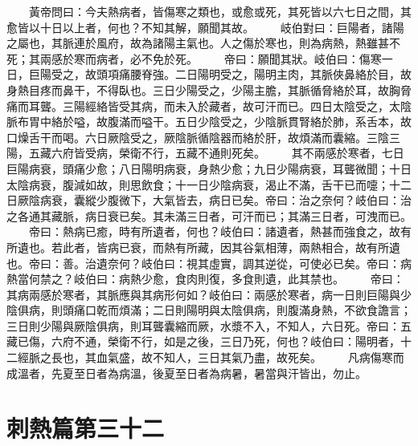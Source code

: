 　　黃帝問曰：今夫熱病者，皆傷寒之類也，或愈或死，其死皆以六七日之間，其愈皆以十日以上者，何也？不知其解，願聞其故。
　　岐伯對曰：巨陽者，諸陽之屬也，其脈連於風府，故為諸陽主氣也。人之傷於寒也，則為病熱，熱雖甚不死；其兩感於寒而病者，必不免於死。
　　帝曰：願聞其狀。岐伯曰：傷寒一日，巨陽受之，故頭項痛腰脊強。二日陽明受之，陽明主肉，其脈俠鼻絡於目，故身熱目疼而鼻干，不得臥也。三日少陽受之，少陽主膽，其脈循脅絡於耳，故胸脅痛而耳聾。三陽經絡皆受其病，而未入於藏者，故可汗而已。四日太陰受之，太陰脈布胃中絡於嗌，故腹滿而嗌干。五日少陰受之，少陰脈貫腎絡於肺，系舌本，故口燥舌干而喝。六日厥陰受之，厥陰脈循陰器而絡於肝，故煩滿而囊縮。三陰三陽，五藏六府皆受病，榮衛不行，五藏不通則死矣。
　　其不兩感於寒者，七日巨陽病衰，頭痛少愈；八日陽明病衰，身熱少愈；九日少陽病衰，耳聾微聞；十日太陰病衰，腹減如故，則思飲食；十一日少陰病衰，渴止不滿，舌干已而嚏；十二日厥陰病衰，囊縱少腹微下，大氣皆去，病日已矣。帝曰：治之奈何？岐伯曰：治之各通其藏脈，病日衰已矣。其未滿三日者，可汗而已；其滿三日者，可洩而已。
　　帝曰：熱病已癒，時有所遺者，何也？岐伯曰：諸遺者，熱甚而強食之，故有所遺也。若此者，皆病已衰，而熱有所藏，因其谷氣相薄，兩熱相合，故有所遺也。帝曰：善。治遺奈何？岐伯曰：視其虛實，調其逆從，可使必已矣。帝曰：病熱當何禁之？岐伯曰：病熱少愈，食肉則復，多食則遺，此其禁也。
　　帝曰：其病兩感於寒者，其脈應與其病形何如？岐伯曰：兩感於寒者，病一日則巨陽與少陰俱病，則頭痛口乾而煩滿；二日則陽明與太陰俱病，則腹滿身熱，不欲食譫言；三日則少陽與厥陰俱病，則耳聾囊縮而厥，水漿不入，不知人，六日死。帝曰：五藏已傷，六府不通，榮衛不行，如是之後，三日乃死，何也？岐伯曰：陽明者，十二經脈之長也，其血氣盛，故不知人，三日其氣乃盡，故死矣。
　　凡病傷寒而成溫者，先夏至日者為病溫，後夏至日者為病暑，暑當與汗皆出，勿止。


\section{刺熱篇第三十二}

